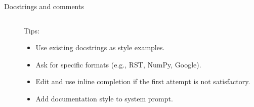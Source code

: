 \documentclass[
  aspectratio=1610,
]{beamer}
\begin{document}
\begin{frame}{Docstrings and comments}
  \begin{columns}[T,totalwidth=\textwidth]
    \begin{column}{0.6\textwidth}
    \end{column}
    \begin{column}{0.37\textwidth}
      Tips:
      \begin{itemize}
        \item Use existing docstrings as style examples.
        \item Ask for specific formats (e.g., RST, NumPy, Google).
        \item Edit and use inline completion if the first attempt is not satisfactory.
        \item Add documentation style to system prompt.
      \end{itemize}
    \end{column}
  \end{columns}
\end{frame}
\end{document}
